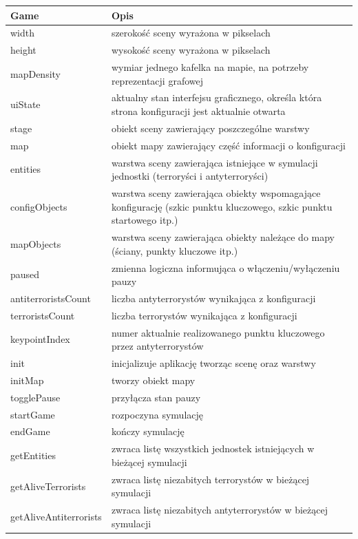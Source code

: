 \begin{table}
\begin{center}
\begin{tabular}{|p{}|p{}|}
\hline
\textbf{Game} & Opis\\\hline		
	width & szerokość sceny wyrażona w pikselach\\
	height & wysokość sceny wyrażona w pikselach\\
	mapDensity & wymiar jednego kafelka na mapie, na potrzeby reprezentacji grafowej\\
	uiState & aktualny stan interfejsu graficznego, określa która strona konfiguracji jest aktualnie otwarta\\
	stage & obiekt sceny zawierający poszczególne warstwy\\
	map & obiekt mapy zawierający część informacji o konfiguracji\\ 
	entities & warstwa sceny zawierająca istniejące w symulacji jednostki (terroryści i antyterroryści)\\
	configObjects & warstwa sceny zawierająca obiekty wspomagające konfigurację (szkic punktu kluczowego, szkic punktu startowego itp.)\\
	mapObjects & warstwa sceny zawierająca obiekty należące do mapy (ściany, punkty kluczowe itp.)\\
	paused & zmienna logiczna informująca o włączeniu/wyłączeniu pauzy\\
	antiterroristsCount & liczba antyterrorystów wynikająca z konfiguracji\\
	terroristsCount & liczba terrorystów wynikająca z konfiguracji\\
	keypointIndex & numer aktualnie realizowanego punktu kluczowego przez antyterrorystów
\\\hline
	init & inicjalizuje aplikację tworząc scenę oraz warstwy\\
	initMap & tworzy obiekt mapy\\
	togglePause & przyłącza stan pauzy\\
	startGame & rozpoczyna symulację\\ 
	endGame & kończy symulację\\
	getEntities & zwraca listę wszystkich jednostek istniejących w bieżącej symulacji\\
	getAliveTerrorists & zwraca listę niezabitych terrorystów w bieżącej symulacji\\ 
	getAliveAntiterrorists & zwraca listę niezabitych antyterrorystów w bieżącej symulacji\\

\end{tabular}
\end{center}
\end{table}

